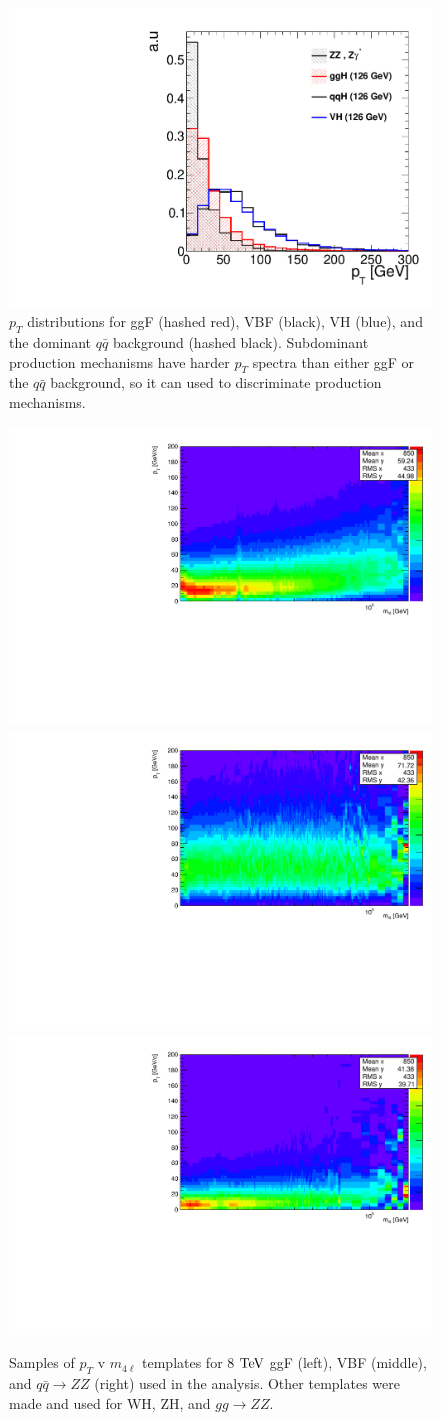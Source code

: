 \begin{figure}[htbp]
\begin{center}
\includegraphics[width=.4\linewidth]{HiggsDiscovery/figures/pt_shape.pdf}
\caption[Transverse Momentum Shapes of Different Higgs Production Mechanisms]{$p_T$ distributions for ggF (hashed red), VBF (black), VH (blue), and the dominant $q\bar{q}$ background (hashed black). Subdominant production mechanisms have harder $p_T$ spectra than either ggF or the $q\bar{q}$ background, so it can used to discriminate production mechanisms.}
\label{fig:HiggspT}
\end{center}
\end{figure}

\begin{figure}[htbp]
\begin{center}
\includegraphics[width=.3\linewidth]{HiggsDiscovery/figures/ptrestricted_ggDefaultTemplate_8TeV.pdf}
\includegraphics[width=.3\linewidth]{HiggsDiscovery/figures/ptrestricted_vbfDefaultTemplate_8TeV.pdf}
\includegraphics[width=.3\linewidth]{HiggsDiscovery/figures/ptrestricted_zzDefaultTemplate_8TeV.pdf}
\caption[Templates of Transverse Momentum for $4\ell$ Signals and Background]{Samples of $p_T$ v $m_{4\ell}$ templates for 8 $\rm{TeV}$ ggF (left), VBF (middle), and $q\bar{q}\rightarrow ZZ$ (right) used in the analysis. Other templates were made and used for WH, ZH, and $gg\rightarrow ZZ$.}
\label{fig:pTTemplates}
\end{center}
\end{figure}

